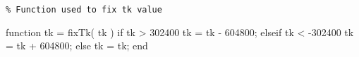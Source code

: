 \color{olivegreen}
\verb!% Function used to fix tk value!

\color{blue}function tk = fixTk( tk )
if tk > 302400
    tk = tk - 604800;
elseif tk < -302400
    tk = tk + 604800;
else
    tk = tk;
end

